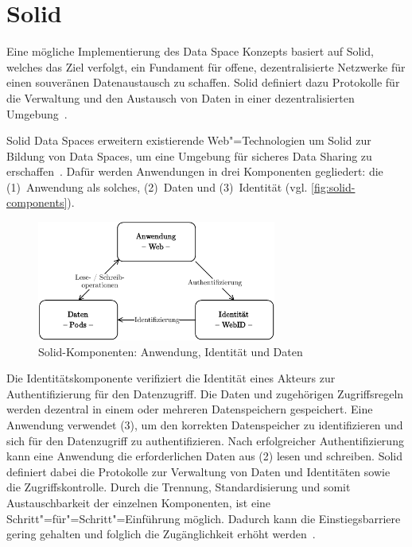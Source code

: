 
\section{Solid}

Eine mögliche Implementierung des Data Space Konzepts basiert auf Solid, welches das Ziel verfolgt, ein Fundament für offene, dezentralisierte Netzwerke für einen souveränen Datenaustausch zu schaffen.
Solid definiert dazu Protokolle für die Verwaltung und den Austausch von Daten in einer dezentralisierten Umgebung~\cite{mecklerWebLinkedData2023}.

Solid Data Spaces erweitern existierende Web"=Technologien um Solid zur Bildung von Data Spaces, um eine Umgebung für sicheres Data Sharing zu erschaffen~\cite{mecklerWebLinkedData2023}.
Dafür werden Anwendungen in drei Komponenten gegliedert: die (1)~Anwendung als solches, (2)~Daten und (3)~Identität (vgl. \autoref{fig:solid-components}).

\begin{figure}[t]
    \includegraphics[width=0.7\textwidth]{./assets/solid_triangle.drawio.pdf}
    \caption{Solid-Komponenten: Anwendung, Identität und Daten}
    \label{fig:solid-components}
\end{figure}

Die Identitätskomponente verifiziert die Identität eines Akteurs zur Authentifizierung für den Datenzugriff.
Die Daten und zugehörigen Zugriffsregeln werden dezentral in einem oder mehreren Datenspeichern gespeichert.
Eine Anwendung verwendet (3), um den korrekten Datenspeicher zu identifizieren und sich für den Datenzugriff zu authentifizieren.
Nach erfolgreicher Authentifizierung kann eine Anwendung die erforderlichen Daten aus (2) lesen und schreiben.
Solid definiert dabei die Protokolle zur Verwaltung von Daten und Identitäten sowie die Zugriffskontrolle.
Durch die Trennung, Standardisierung und somit Austauschbarkeit der einzelnen Komponenten, ist eine Schritt"=für"=Schritt"=Einführung möglich.
Dadurch kann die Einstiegsbarriere gering gehalten und folglich die Zugänglichkeit erhöht werden~\cite{mecklerWebLinkedData2023}.


